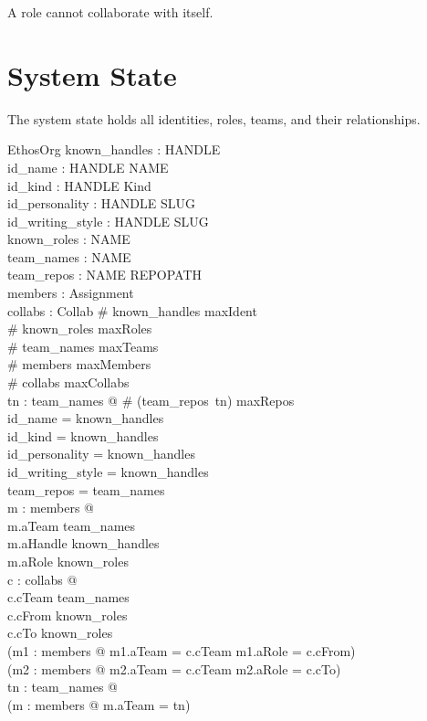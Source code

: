 \documentclass[a4paper,10pt,fleqn]{article}
\begin{document}
A role cannot collaborate with itself.

\section{System State}

The system state holds all identities, roles, teams, and their
relationships.

\begin{schema}{EthosOrg}
  known\_handles : \finset HANDLE \\
  id\_name : HANDLE \pfun NAME \\
  id\_kind : HANDLE \pfun Kind \\
  id\_personality : HANDLE \pfun SLUG \\
  id\_writing\_style : HANDLE \pfun SLUG \\
  known\_roles : \finset NAME \\
  team\_names : \finset NAME \\
  team\_repos : NAME \pfun \finset REPOPATH \\
  members : \finset Assignment \\
  collabs : \finset Collab
\where
  \# known\_handles \leq maxIdent \\
  \# known\_roles \leq maxRoles \\
  \# team\_names \leq maxTeams \\
  \# members \leq maxMembers \\
  \# collabs \leq maxCollabs \\
  \forall tn : team\_names @ \# (team\_repos~tn) \leq maxRepos \\
  \dom id\_name = known\_handles \\
  \dom id\_kind = known\_handles \\
  \dom id\_personality = known\_handles \\
  \dom id\_writing\_style = known\_handles \\
  \dom team\_repos = team\_names \\
  \forall m : members @ \\
  \quad m.aTeam \in team\_names \land \\
  \quad m.aHandle \in known\_handles \land \\
  \quad m.aRole \in known\_roles \\
  \forall c : collabs @ \\
  \quad c.cTeam \in team\_names \land \\
  \quad c.cFrom \in known\_roles \land \\
  \quad c.cTo \in known\_roles \land \\
  \quad (\exists m1 : members @ m1.aTeam = c.cTeam \land m1.aRole = c.cFrom) \land \\
  \quad (\exists m2 : members @ m2.aTeam = c.cTeam \land m2.aRole = c.cTo) \\
  \forall tn : team\_names @ \\
  \quad (\exists m : members @ m.aTeam = tn)
\end{schema}
\end{document}
